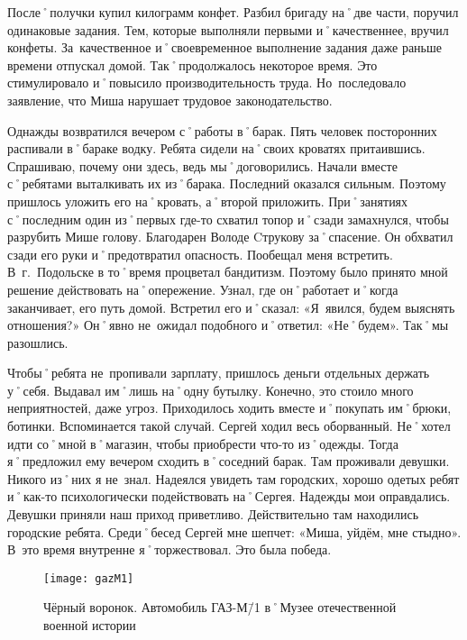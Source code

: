 После˚получки купил килограмм конфет. Разбил бригаду на˚две части, поручил одинаковые задания. Тем, которые выполняли первыми и˚качественнее, вручил конфеты. За~качественное и˚своевременное выполнение задания даже раньше времени отпускал домой. Так˚продолжалось некоторое время. Это стимулировало и˚повысило производительность труда. Но~последовало заявление, что Миша нарушает трудовое законодательство.

Однажды возвратился вечером с˚работы в˚барак. Пять человек посторонних распивали в˚бараке водку. Ребята сидели на˚своих кроватях притаившись. Спрашиваю, почему они здесь, ведь мы˚договорились. Начали вместе с˚ребятами выталкивать их из˚барака. Последний оказался сильным. Поэтому пришлось уложить его на˚кровать, а˚второй приложить. При˚занятиях с˚последним один из˚первых где-то схватил топор и˚сзади замахнулся, чтобы разрубить Мише голову. Благодарен Володе Cтрукову за˚спасение. Он обхватил сзади его руки и˚предотвратил опасность. Пообещал меня встретить. В~г.~Подольске в то˚время процветал бандитизм. Поэтому было принято мной решение действовать на˚опережение. Узнал, где он˚работает и˚когда заканчивает, его путь домой. Встретил его и˚сказал: «Я~явился, будем выяснять отношения?» Он˚явно не~ожидал подобного и˚ответил: «Не˚будем». Так˚мы разошлись.

Чтобы˚ребята не~пропивали зарплату, пришлось деньги отдельных держать у˚себя. Выдавал им˚лишь на˚одну бутылку. Конечно, это стоило много неприятностей, даже угроз. Приходилось ходить вместе и˚покупать им˚брюки, ботинки. Вспоминается такой случай. Сергей ходил весь оборванный. Не˚хотел идти со˚мной в˚магазин, чтобы приобрести что-то из˚одежды. Тогда я˚предложил ему вечером сходить в˚соседний барак. Там проживали девушки. Никого из˚них я не~знал. Надеялся увидеть там городских, хорошо одетых ребят и˚как-то психологически подействовать на˚Сергея. Надежды мои оправдались. Девушки приняли наш приход приветливо. Действительно там находились городские ребята. Среди˚бесед Сергей мне шепчет: «Миша, уйдём, мне стыдно». В~это время внутренне я˚торжествовал. Это была победа.

\begin{wrapfigure}{O}{.4\textwidth}
\centering
\texttt{[image: gazM1]}
\caption[Чёрный воронок. Автомобиль ГАЗ-М\=/1 в˚Музее отечественной военной истории]{Чёрный воронок. Автомобиль ГАЗ-М\=/1 в˚Музее отечественной военной истории\footnotemark}
\label{fig:gazM1}
\end{wrapfigure}

